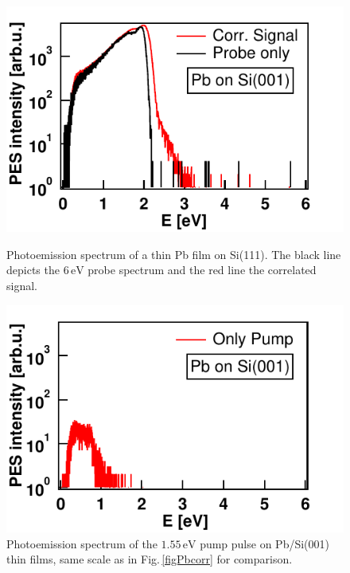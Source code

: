 \documentclass[a4paper,12pt,twoside]{article}
\begin{document}
 	\begin{figure}[H]
 	    \begin{minipage}[t]{.45\linewidth}
        	\includegraphics[width=\linewidth]{figures/Pbcorr.pdf}
			\caption{Photoemission spectrum of a thin Pb film on Si(111). The black line depicts the $6\,\mathrm{eV}$ probe spectrum and the red line the correlated signal.}
			    \label{figPbcorr}
		\end{minipage}
			\hspace{.075\linewidth}
		\begin{minipage}[t]{.45\linewidth}
			\includegraphics[width=\linewidth]{figures/PBonlypump.pdf}
			\caption{Photoemission spectrum of the $1.55\,\mathrm{eV}$ pump pulse on Pb/Si(001) thin films, same scale as in Fig.\,\ref{figPbcorr} for comparison.}
			    \label{figPbpump}
		\end{minipage}
	\end{figure}
\end{document}
